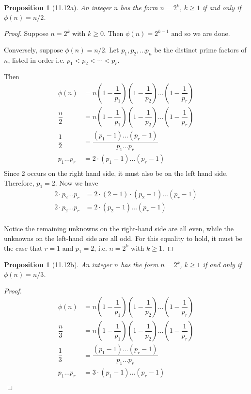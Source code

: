 \documentclass[letterpaper, 12pt, oneside]{memoir}
\theoremstyle{mystyle}
\newtheorem{prop}[thm]{Proposition}
\begin{document}
\begin{prop}[11.12a]
    An integer $n$ has the form $n=2^k$, $k \geq 1$ if and only if 
    $\phi(n) = n/2$.
\end{prop}
\begin{proof}
    Suppose $n=2^k$ with $k \geq 0$. Then $\phi(n) = 2^{k-1}$ and so we are
    done.
    
    Conversely, suppose $\phi(n)=n/2$. Let $p_1, p_2, \dots p_n$ be the distinct
    prime factors of $n$, listed in order i.e. $p_1 < p_2 < \cdots < p_r$.
    
    Then
    \begin{align*}
        \phi(n) &= n \left( 1 - \dfrac{1}{p_1} \right) \left( 1 - \dfrac{1}{p_2} \right) \dots \left( 1 - \dfrac{1}{p_r} \right) \\
        \dfrac{n}{2} &= n \left( 1 - \dfrac{1}{p_1} \right) \left( 1 - \dfrac{1}{p_2} \right) \dots \left( 1 - \dfrac{1}{p_r} \right) \\
        \dfrac{1}{2} &= \dfrac{(p_1 - 1) \dots (p_r - 1)}{p_1 \dots p_r} \\
        p_1 \dots p_r &= 2 \cdot (p_1 - 1) \dots (p_r - 1) \\
    \end{align*}
    Since 2 occurs on the right hand side, it must also be on the left hand
    side. Therefore, $p_1 = 2$. Now we have
    \begin{align*}
    2 \cdot p_2 \dots p_r &= 2 \cdot (2 - 1) \cdot (p_2 - 1) \dots (p_r - 1) \\
    2 \cdot p_2 \dots p_r &= 2 \cdot (p_2 - 1) \dots (p_r - 1) \\
    \end{align*}
    
    Notice the remaining unknowns on the right-hand side are all even, while
    the unknowns on the left-hand side are all odd. For this equality to hold,
    it must be the case that $r=1$ and $p_1 = 2$, i.e. $n=2^k$ with $k \geq 1$.
\end{proof}


\begin{prop}[11.12b]
    An integer $n$ has the form $n=2^k$, $k \geq 1$ if and only if 
    $\phi(n) = n/3$.
\end{prop}
\begin{proof}
    \begin{align*}
        \phi(n) &= n \left( 1 - \dfrac{1}{p_1} \right) \left( 1 - \dfrac{1}{p_2} \right) \dots \left( 1 - \dfrac{1}{p_r} \right) \\
        \dfrac{n}{3} &= n \left( 1 - \dfrac{1}{p_1} \right) \left( 1 - \dfrac{1}{p_2} \right) \dots \left( 1 - \dfrac{1}{p_r} \right) \\
        \dfrac{1}{3} &= \dfrac{(p_1 - 1) \dots (p_r - 1)}{p_1 \dots p_r} \\
        p_1 \dots p_r &= 3 \cdot (p_1 - 1) \dots (p_r - 1) \\
    \end{align*}
\end{proof}
\end{document}
